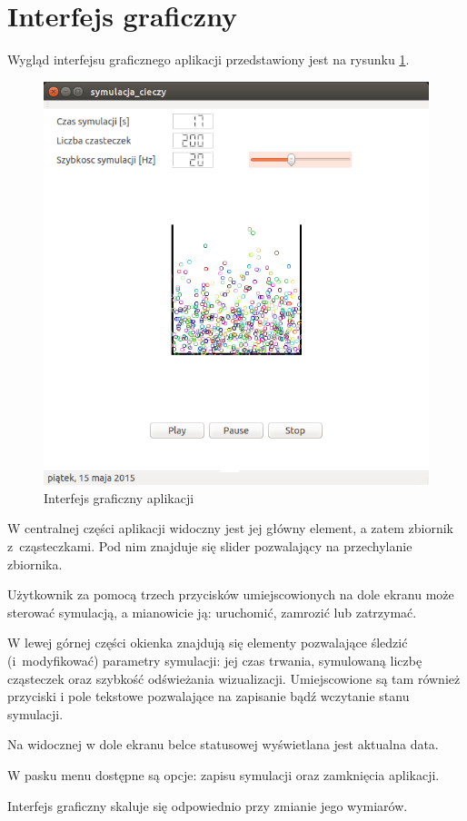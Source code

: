 
\section{Interfejs graficzny}
Wygląd interfejsu graficznego aplikacji przedstawiony jest na rysunku \ref{fig:gui}.

\begin{figure}[H]
 \begin{center} 
  \includegraphics[width=\textwidth] {rysunki/gui.png} 
 \end{center}
 \caption{Interfejs graficzny aplikacji}
 \label{fig:gui} 
\end{figure}

W centralnej części aplikacji widoczny jest jej główny element, a zatem zbiornik z~cząsteczkami. Pod nim znajduje się slider pozwalający na przechylanie zbiornika.

Użytkownik za pomocą trzech przycisków umiejscowionych na dole ekranu może sterować symulacją, a mianowicie ją: uruchomić, zamrozić lub zatrzymać.  

W lewej górnej części okienka znajdują się elementy pozwalające śledzić (i~modyfikować) parametry symulacji: jej czas trwania, symulowaną liczbę cząsteczek oraz szybkość odświeżania wizualizacji. Umiejscowione są tam również przyciski i pole tekstowe pozwalające na zapisanie bądź wczytanie stanu symulacji.

Na widocznej w dole ekranu belce statusowej wyświetlana jest aktualna data.

W pasku menu dostępne są opcje: zapisu symulacji oraz zamknięcia aplikacji.

Interfejs graficzny skaluje się odpowiednio przy zmianie jego wymiarów.